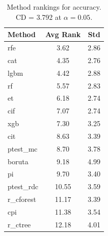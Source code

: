 \begin{table}[h]
\centering
\caption{Method rankings for accuracy. CD = 3.792 at $\alpha=0.05$.}
\label{tab:ranks_accuracy}
\begin{tabular}{lcc}
\toprule
Method & Avg Rank & Std \\
\midrule
rfe & 3.62 & 2.86 \\
cat & 4.35 & 2.76 \\
lgbm & 4.42 & 2.88 \\
rf & 5.57 & 2.83 \\
et & 6.18 & 2.74 \\
cif & 7.07 & 2.74 \\
xgb & 7.30 & 3.25 \\
cit & 8.63 & 3.39 \\
ptest_mc & 8.70 & 3.78 \\
boruta & 9.18 & 4.99 \\
pi & 9.70 & 3.40 \\
ptest_rdc & 10.55 & 3.59 \\
r_cforest & 11.17 & 3.39 \\
cpi & 11.38 & 3.54 \\
r_ctree & 12.18 & 4.01 \\
\bottomrule
\end{tabular}
\end{table}